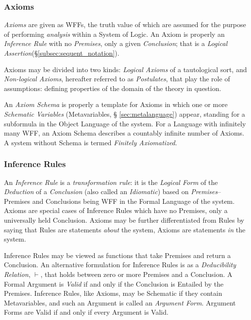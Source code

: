 \documentclass{article}
\begin{document}
\subsubsection{Axioms}\label{subsec:axiomatization}

\emph{Axioms} are given as WFFs, the truth value of which are assumed
for the purpose of performing \emph{analysis} within a System of
Logic. An Axiom is properly an \emph{Inference Rule} with no
\emph{Premises}, only a given \emph{Conclusion}; that is a
\emph{Logical Assertion}(\S\ref{subsec:sequent_notation}).

Axioms may be divided into two kinds: \emph{Logical Axioms} of a
tautological sort, and \emph{Non-logical Axioms}, hereafter referred
to as \emph{Postulates}, that play the role of assumptions: defining
properties of the domain of the theory in question.

An \emph{Axiom Schema} is properly a template for Axioms in which one
or more \emph{Schematic Variables} (Metavariables, \S
\ref{sec:metalanguage}) appear, standing for a subformula in the
Object Language of the system. For a Language with infinitely many
WFF, an Axiom Schema describes a countably infinite number of
Axioms. A system without Schema is termed \emph{Finitely Axiomatized}.

\subsubsection{Inference Rules} \label{subsec:inference_rules}

An \emph{Inference Rule} is a \emph{transformation rule}: it is the
\emph{Logical Form} of the \emph{Deduction} of a \emph{Conclusion}
(also called an \emph{Idiomatic}) based on \emph{Premises}-- Premises
and Conclusions being WFF in the Formal Language of the system. Axioms
are special cases of Inference Rules which have no Premises, only a
universally held Conclusion. Axioms may be further differentiated from
Rules by saying that Rules are statements \emph{about} the system,
Axioms are statements \emph{in} the system.

Inference Rules may be viewed as functions that take Premises and
return a Conclusion. An alternative formulation for Inference Rules is
as a \emph{Deducibility Relation}, $\vdash$, that holds between zero
or more Premises and a Conclusion. A Formal Argument is \emph{Valid}
if and only if the Conclusion is Entailed by the Premises. Inference
Rules, like Axioms, may be Schematic if they contain Metavariables,
and such an Argument is called an \emph{Argument Form}. Argument Forms
are Valid if and only if every Argument is Valid.
\end{document}
